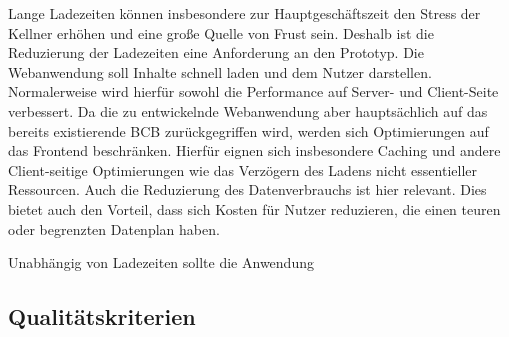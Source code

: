 Lange Ladezeiten können insbesondere zur Hauptgeschäftszeit den Stress der Kellner erhöhen und eine große Quelle von Frust sein. Deshalb ist die Reduzierung der Ladezeiten eine Anforderung an den Prototyp. Die Webanwendung soll Inhalte schnell laden und dem Nutzer darstellen. Normalerweise wird hierfür sowohl die Performance auf Server- und Client-Seite verbessert. Da die zu entwickelnde Webanwendung aber hauptsächlich auf das bereits existierende \ac{BCB} zurückgegriffen wird, werden sich Optimierungen auf das Frontend beschränken. Hierfür eignen sich insbesondere Caching und andere Client-seitige Optimierungen wie das Verzögern des Ladens nicht essentieller Ressourcen. Auch die Reduzierung des Datenverbrauchs ist hier relevant. Dies bietet auch den Vorteil, dass sich Kosten für Nutzer reduzieren, die einen teuren oder begrenzten Datenplan haben.

Unabhängig von Ladezeiten sollte die Anwendung 

\subsection{Qualitätskriterien}
